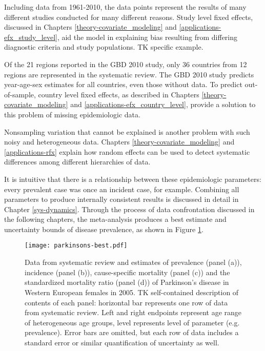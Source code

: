 Including data from 1961-2010, the data points represent the results
of many different studies conducted for many different reasons.  Study
level fixed effects, discussed in Chapters
\ref{theory-covariate_modeling} and
\ref{applications-efx_study_level}, aid the model in explaining bias
resulting from differing diagnostic criteria and study populations. TK
specific example.

Of the 21 regions reported in the GBD 2010 study, only 36 countries
from 12 regions are represented in the systematic review.  The GBD
2010 study predicts year-age-sex estimates for all countries, even
those without data.  To predict out-of-sample, country level fixed
effects, as described in Chapters \ref{theory-covariate_modeling} and
\ref{applications-efx_country_level}, provide a solution to this
problem of missing epidemiologic data.

Nonsampling variation that cannot be explained is another problem with
such noisy and heterogeneous data.  Chapters
\ref{theory-covariate_modeling} and \ref{applications-rfx} explain how
random effects can be used to detect systematic differences among
different hierarchies of data.

It is intuitive that there is a relationship between these
epidemiologic parameters: every prevalent case was once an incident
case, for example.  Combining all parameters to produce internally
consistent results is discussed in detail in Chapter
\ref{sys-dynamics}.  Through the process of data confrontation
discussed in the following chapters, the meta-analysis produces a best
estimate and uncertainty bounds of disease prevalence, as shown in
Figure \ref{fig:intro-parkinsons fit}.

    \begin{figure}[h]
        \begin{center}
            \texttt{[image: parkinsons-best.pdf]}
            \caption{Data from systematic review and estimates of
              prevalence (panel (a)), incidence (panel (b)),
              cause-specific mortality (panel (c)) and the
              standardized mortality ratio (panel (d)) of Parkinson's
              disease in Western European females in 2005. TK
              self-contained description of contents of each panel:
              horizontal bar represents one row of data from
              systematic review.  Left and right endpoints represent
              age range of heterogeneous age groups, level represents
              level of parameter (e.g. prevalence).  Error bars are
              omitted, but each row of data includes a standard error
              or similar quantification of uncertainty as well.}
            \label{fig:intro-parkinsons fit}
        \end{center}
    \end{figure} 
